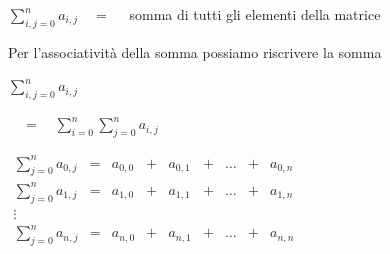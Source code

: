 \documentclass[12pt,openany]{book}
\theoremstyle{mio}
\theoremstyle{liscio}
\begin{document}
\hfil$\displaystyle\sum^n_{i,j=0} a_{i,j}\quad =\quad$ somma di tutti gli elementi della matrice


Per l'associativit\`a della somma possiamo riscrivere la somma

\parbox{20ex}{\hfill$\displaystyle\sum^n_{i,j=0} a_{i,j}$}$\displaystyle\quad =\quad\sum^n_{i=0}\sum^n_{j=0}a_{i,j}$


$\displaystyle\begin{array}{ccccccccc}
\displaystyle\sum^n_{j=0}a_{0,j}&=& a_{0,0}&+&a_{0,1}&+&\dots&+&a_{0,n}\\[1ex]
\displaystyle\sum^n_{j=0}a_{1,j}&=& a_{1,0}&+&a_{1,1}&+&\dots&+&a_{1,n}\\[2ex]
\vdots\\[2ex]
\displaystyle\sum^n_{j=0}a_{n,j}&=& a_{n,0}&+&a_{n,1}&+&\dots&+&a_{n,n}\\
\end{array}$
\end{document}
